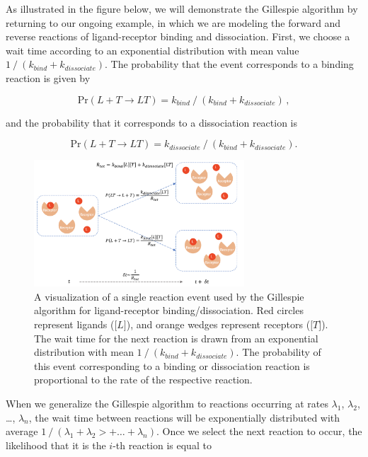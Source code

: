\begin{qbox}\end{qbox}

As illustrated in the figure below, we will demonstrate the Gillespie algorithm by returning to our ongoing example, in which we are modeling the forward and reverse reactions of ligand-receptor binding and dissociation. First, we choose a wait time according to an exponential distribution with mean value $1\mathbin{/}(k_{bind} + k_{dissociate})$. The probability that the event corresponds to a binding reaction is given by

$$\mathrm{Pr}(L + T \rightarrow LT) = k_{bind}\mathbin{/}(k_{bind} + k_{dissociate})\,,$$

and the probability that it corresponds to a dissociation reaction is

$$\mathrm{Pr}(L + T \rightarrow LT) = k_{dissociate}\mathbin{/}(k_{bind} + k_{dissociate}).$$

\begin{figure}[h]
\centering
\mySfFamily
\includegraphics[width = 0.7\textwidth]{../images/chemotaxis_visualizessa.png}
\caption{A visualization of a single reaction event used by the Gillespie algorithm for ligand-receptor binding/dissociation. Red circles represent ligands ($\text{[}L\text{]}$), and orange wedges represent receptors ($\text{[}T\text{]}$). The wait time for the next reaction is drawn from an exponential distribution with mean $1\mathbin{/}(k_{bind} + k_{dissociate})$. The probability of this event corresponding to a binding or dissociation reaction is proportional to the rate of the respective reaction.}
\label{fig:chemotaxis_visualizessa}
\end{figure}


When we generalize the Gillespie algorithm to  reactions occurring at rates $λ_1$, $λ_2$, …, $λ_n$, the wait time between reactions will be exponentially distributed with average $1\mathbin{/}(λ_1 + λ_2> + … + λ_n)$. Once we select the next reaction to occur, the likelihood that it is the $i$-th reaction is equal to

